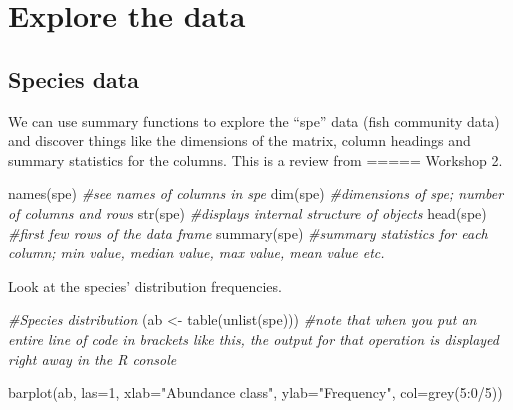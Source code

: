 \documentclass[
]{book}
\newenvironment{Shaded}{\begin{snugshade}}{\end{snugshade}}
\newcommand{\AttributeTok}[1]{\textcolor[rgb]{0.77,0.63,0.00}{#1}}
\newcommand{\CommentTok}[1]{\textcolor[rgb]{0.56,0.35,0.01}{\textit{#1}}}
\newcommand{\DecValTok}[1]{\textcolor[rgb]{0.00,0.00,0.81}{#1}}
\newcommand{\FunctionTok}[1]{\textcolor[rgb]{0.00,0.00,0.00}{#1}}
\newcommand{\NormalTok}[1]{#1}
\newcommand{\OtherTok}[1]{\textcolor[rgb]{0.56,0.35,0.01}{#1}}
\newcommand{\SpecialCharTok}[1]{\textcolor[rgb]{0.00,0.00,0.00}{#1}}
\newcommand{\StringTok}[1]{\textcolor[rgb]{0.31,0.60,0.02}{#1}}
\begin{document}
\hypertarget{explore-the-data}{%
\chapter{Explore the data}\label{explore-the-data}}

\hypertarget{species-data}{%
\section{Species data}\label{species-data}}

We can use summary functions to explore the ``spe'' data (fish community
data) and discover things like the dimensions of the matrix, column
headings and summary statistics for the columns. This is a review from
===== Workshop 2.

\begin{Shaded}
\begin{Highlighting}[]
\FunctionTok{names}\NormalTok{(spe) }\CommentTok{\#see names of columns in spe}
\FunctionTok{dim}\NormalTok{(spe) }\CommentTok{\#dimensions of spe; number of columns and rows }
\FunctionTok{str}\NormalTok{(spe) }\CommentTok{\#displays internal structure of objects}
\FunctionTok{head}\NormalTok{(spe) }\CommentTok{\#first few rows of the data frame}
\FunctionTok{summary}\NormalTok{(spe) }\CommentTok{\#summary statistics for each column; min value, median value, max value, mean value etc.  }
\end{Highlighting}
\end{Shaded}

Look at the species' distribution frequencies.

\begin{Shaded}
\begin{Highlighting}[]
\CommentTok{\#Species distribution}
\NormalTok{(ab }\OtherTok{\textless{}{-}} \FunctionTok{table}\NormalTok{(}\FunctionTok{unlist}\NormalTok{(spe))) }\CommentTok{\#note that when you put an entire line of code in brackets like this, the output for that operation is displayed right away in the R console}

\FunctionTok{barplot}\NormalTok{(ab, }\AttributeTok{las=}\DecValTok{1}\NormalTok{, }\AttributeTok{xlab=}\StringTok{"Abundance class"}\NormalTok{, }\AttributeTok{ylab=}\StringTok{"Frequency"}\NormalTok{, }\AttributeTok{col=}\FunctionTok{grey}\NormalTok{(}\DecValTok{5}\SpecialCharTok{:}\DecValTok{0}\SpecialCharTok{/}\DecValTok{5}\NormalTok{))}
\end{Highlighting}
\end{Shaded}
\end{document}
